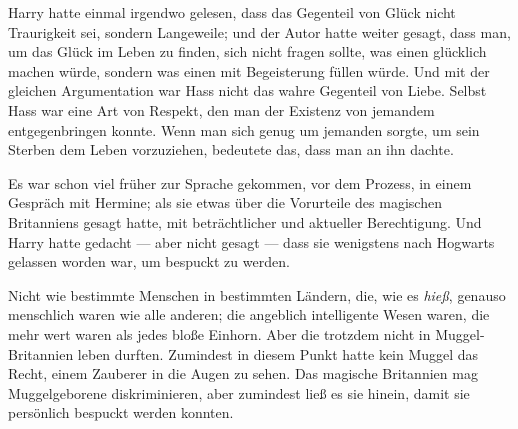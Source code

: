 Harry hatte einmal irgendwo gelesen, dass das Gegenteil von Glück nicht Traurigkeit sei, sondern Langeweile; und der Autor hatte weiter gesagt, dass man, um das Glück im Leben zu finden, sich nicht fragen sollte, was einen glücklich machen würde, sondern was einen mit Begeisterung füllen würde. Und mit der gleichen Argumentation war Hass nicht das wahre Gegenteil von Liebe. Selbst Hass war eine Art von Respekt, den man der Existenz von jemandem entgegenbringen konnte. Wenn man sich genug um jemanden sorgte, um sein Sterben dem Leben vorzuziehen, bedeutete das, dass man an ihn dachte.

Es war schon viel früher zur Sprache gekommen, vor dem Prozess, in einem Gespräch mit Hermine; als sie etwas über die Vorurteile des magischen Britanniens gesagt hatte, mit beträchtlicher und aktueller Berechtigung. Und Harry hatte gedacht — aber nicht gesagt — dass sie wenigstens nach Hogwarts gelassen worden war, um bespuckt zu werden.

Nicht wie bestimmte Menschen in bestimmten Ländern, die, wie es \emph{hieß}, genauso menschlich waren wie alle anderen; die angeblich intelligente Wesen waren, die mehr wert waren als jedes bloße Einhorn. Aber die trotzdem nicht in Muggel-Britannien leben durften. Zumindest in diesem Punkt hatte kein Muggel das Recht, einem Zauberer in die Augen zu sehen. Das magische Britannien mag Muggelgeborene diskriminieren, aber zumindest ließ es sie hinein, damit sie persönlich bespuckt werden konnten.

